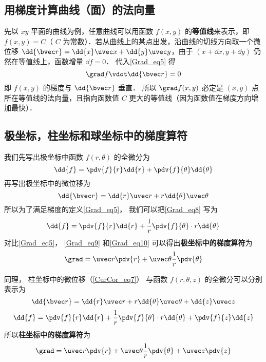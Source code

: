 \subsection{用梯度计算曲线（面）的法向量}
先以 $xy$ 平面的曲线为例，任意曲线可以用函数 $f(x,y)$ 的\textbf{等值线}来表示，即 $f(x,y) = C$（ $C$ 为常数）．若从曲线上的某点出发，沿曲线的切线方向取一个微位移 $\dd{\bvec r} = \dd{x}\uvec x + \dd{y} \uvec y$，由于 $(x+\dd{x}, y+\dd{y})$ 仍然在等值线上，函数增量 $\dd{f} = 0$． 代入\autoref{Grad_eq5} 得
\begin{equation}
\grad f \vdot \dd{\bvec r} = 0
\end{equation}
即 $f(x,y)$ 的梯度与 $\dd{\bvec r}$ 垂直． 所以 $\grad f(x,y)$ 必定是 $(x,y)$ 点所在等值线的法向量，且指向函数值 $C$ 更大的等值线（因为函数值在梯度方向增加最快）．

\subsection{极坐标，柱坐标和球坐标中的梯度算符}

我们先写出极坐标中函数 $f(r,\theta)$ 的全微分为
\begin{equation}\label{Grad_eq8}
\dd{f} = \pdv{f}{r} \dd{r} + \pdv{f}{\theta} \dd{\theta}
\end{equation}
再写出极坐标中的微位移为
\begin{equation}\label{Grad_eq9}
\dd{\bvec r} = \dd{r} \uvec r + r \dd{\theta} \uvec \theta
\end{equation}
所以为了满足梯度的定义\autoref{Grad_eq5}， 我们可以把\autoref{Grad_eq8} 写为
\begin{equation}\label{Grad_eq10}
\dd{f} = \pdv{f}{r} \dd{r} + \frac1r \pdv{f}{\theta} \cdot r\dd{\theta}
\end{equation}
对比\autoref{Grad_eq5}， \autoref{Grad_eq9} 和\autoref{Grad_eq10} 可以得出\textbf{极坐标中的梯度算符}为
\begin{equation}
\grad = \uvec r \pdv{r} + \uvec \theta \frac1r \pdv{\theta}
\end{equation}

同理， 柱坐标中的微位移（\autoref{CurCor_eq7}） 与函数 $f(r,\theta, z)$ 的全微分可以分别表示为
\begin{equation}
\dd{\bvec r} = \dd{r} \uvec r + r\dd{\theta} \uvec \theta + \dd{z} \uvec z
\end{equation}
\begin{equation}
\dd{f} = \pdv{f}{r} \dd{r} + \frac1r \pdv{f}{\theta} \cdot  r\dd{\theta} + \pdv{f}{z} \dd{z}
\end{equation}
所以\textbf{柱坐标中的梯度算符}为
\begin{equation}
\grad = \uvec r \pdv{r} + \uvec \theta \frac1r \pdv{\theta} + \uvec z \pdv{z}
\end{equation}

